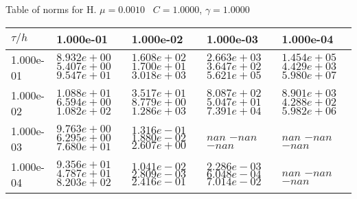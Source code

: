 \begin{center}
Table of norms for H. $\mu = 0.0010$ \, $C = 1.0000$, $\gamma = 1.0000$
  
\begin{tabular}{|p{1in}|p{1in}|p{1in}|p{1in}|p{1in}|} \hline
$\tau / h$ &1.000e-01 &1.000e-02 &1.000e-03 &1.000e-04 \\ \hline 
1.000e-01 & $8.932e+00$  $5.407e+00$  $9.547e+01$  & $1.608e+02$  $1.700e+01$  $3.018e+03$  & $2.663e+03$  $3.647e+02$  $5.621e+05$  & $1.454e+05$  $4.429e+03$  $5.980e+07$  \\ \hline 
1.000e-02 & $1.088e+01$  $6.594e+00$  $1.082e+02$  & $3.517e+01$  $8.779e+00$  $1.286e+03$  & $8.087e+02$  $5.047e+01$  $7.391e+04$  & $8.901e+03$  $4.288e+02$  $5.982e+06$  \\ \hline 
1.000e-03 & $9.763e+00$  $6.295e+00$  $7.680e+01$  & $1.316e-01$  $1.880e-02$  $2.607e+00$  & $nan$  $-nan$  $-nan$  & $nan$  $-nan$  $-nan$  \\ \hline 
1.000e-04 & $9.356e+01$  $4.787e+01$  $8.203e+02$  & $1.041e-02$  $2.809e-03$  $2.416e-01$  & $2.286e-03$  $6.048e-04$  $7.014e-02$  & $nan$  $-nan$  $-nan$  \\ \hline 

\end{tabular}\\[20pt]
\end{center}

